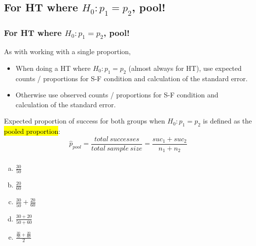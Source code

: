 \documentclass[11pt,containsverbatim,handout,xcolor=xelatex,dvipsnames,table]{beamer}
\newcommand{\solnMult}[1]{#1}
\begin{document}

\subsection{For HT where $H_0: p_1 = p_2$, pool!}
\label{mi2}


\begin{frame}
\frametitle{For HT where $H_0: p_1 = p_2$, pool!}

As with working with a single proportion,

\begin{itemize}

\item When doing a HT where $H_0: p_1 = p_2$ (almost always for HT), use expected counts / proportions for S-F condition and calculation of the standard error.

\item Otherwise use observed counts / proportions for S-F condition and calculation of the standard error.

\end{itemize}

\pause 

Expected proportion of success for both groups when $H_0: p_1 = p_2$ is defined as the \hl{pooled proportion}:
\[ \hat{p}_{pool} = \frac{total~successes}{total~sample~size} = \frac{suc_1 + suc_2}{n_1 + n_2} \]

\end{frame}


\begin{frame}
\frametitle{}


\begin{enumerate}[(a)]
\item $\frac{30}{50}$
\item $\frac{20}{60}$
\item $\frac{30}{50} + \frac{20}{60}$
\item \solnMult{$\frac{30 + 20}{50 + 60}$}
\item $\frac{\frac{30}{50} + \frac{20}{60}}{2}$
\end{enumerate}

\end{frame}
\end{document}

